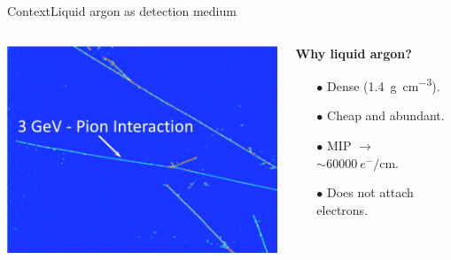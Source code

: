 \documentclass[10pt]{beamer}
\begin{document}
    \begin{frame}{Context}{Liquid argon as detection medium}
    	\begin{columns}
    		\begin{column}{0.6\textwidth}
    			\centering
    			\includegraphics[width=\textwidth]{figures/contexte/SP_evt.png}
    		\end{column}
    		\begin{column}{0.4\textwidth}
    			\begin{scriptsize}
    				\textbf{Why liquid argon?}
    			\end{scriptsize}
    			\begin{itemize}
    				\item[$\bullet$] Dense (\SI{1.4}{\gram\per\centi\meter^3}).
    				\item[$\bullet$] Cheap and abundant.
    				\item[$\bullet$] MIP $\rightarrow$ $\sim\SI{60000}{e^-\per\centi\meter}$.
    				\item[$\bullet$] Does not attach electrons.
    			\end{itemize}
    		\end{column}
    	\end{columns}
    \end{frame}
    
\end{document}
